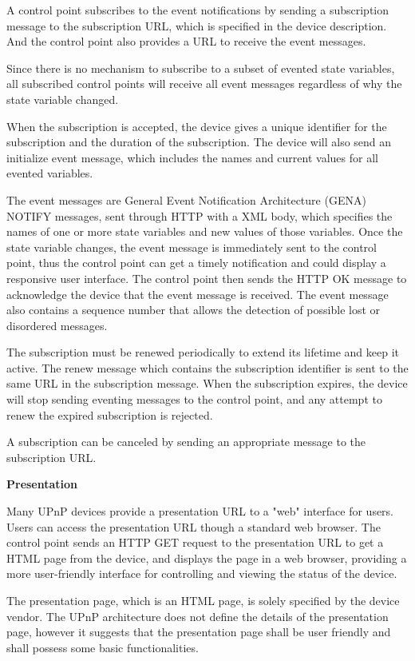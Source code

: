 A control point subscribes to the event notifications by sending a subscription message to the 
subscription URL, which is specified in the device description. And the control
point also provides a URL to receive the event messages.

Since there is no mechanism to subscribe to a subset of evented state variables, all subscribed 
control points will receive all event messages regardless of why the state
variable changed.

When the subscription is accepted, the device gives a unique identifier for the subscription and 
the duration of the subscription. The device will also send an initialize event message, which 
includes the names and current values for all evented variables.

The event messages are General Event Notification Architecture (GENA) NOTIFY 
messages, sent through HTTP with a XML body, which specifies the names of one or 
more state variables and new values of those variables. Once the state variable 
changes, the event message is immediately sent to the control point, thus the 
control point can get a timely notification and could display a responsive user 
interface. The control point then sends the HTTP OK message to acknowledge the device 
that the event message is received. The event message also contains a sequence 
number that allows the detection of possible lost or disordered messages.

The subscription must be renewed periodically to extend its lifetime and keep it active. The renew 
message which contains the subscription identifier is sent to the same URL in the subscription 
message. When the subscription expires, the device will stop sending eventing messages to the 
control point, and any attempt to renew the expired subscription is rejected.

A subscription can be canceled by sending an appropriate message to the
subscription URL.

\textbf{Presentation}

Many UPnP devices provide a presentation URL to a "web" interface for users. Users can access the 
presentation URL though a standard web browser. The control point sends an HTTP GET request to the 
presentation URL to get a HTML page from the device, and displays the page in a web browser, 
providing a more user-friendly interface for controlling and viewing the status
of the device.

The presentation page, which is an HTML page, is solely specified by the device vendor.
The UPnP architecture does not define the details of the presentation page,
however it suggests that the presentation page shall be user friendly and shall
possess some basic functionalities.
